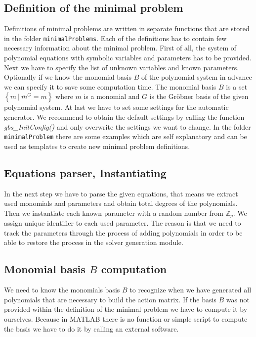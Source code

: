 \subsection{Definition of the minimal problem}
\label{subsec:MinimalProblemDefinition}
Definitions of minimal problems are written in separate functions that are stored in the folder \texttt{minimalProblems}. Each of the definitions has to contain few necessary information about the minimal problem. First of all, the system of polynomial equations with symbolic variables and parameters has to be provided. Next we have to specify the list of unknown variables and known parameters. Optionally if we know the monomial basis $B$ of the polynomial system in advance we can specify it to save some computation time. The monomial basis $B$ is a set $\left\{m\ |\ \overline{m}^G = m\right\}$ where $m$ is a monomial and $G$ is the Gr\"obner basis of the given polynomial system. At last we have to set some settings for the automatic generator. We recommend to obtain the default settings by calling the function \textit{gbs\_InitConfig()} and only overwrite the settings we want to change. In the folder \texttt{minimalProblem} there are some examples which are self explanatory and can be used as templates to create new minimal problem definitions.

\subsection{Equations parser, Instantiating}
In the next step we have to parse the given equations, that means we extract used monomials and parameters and obtain total degrees of the polynomials. Then we instantiate each known parameter with a random number from $\mathbb{Z}_p$. We assign unique identifier to each used parameter. The reason is that we need to track the parameters through the process of adding polynomials in order to be able to restore the process in the solver generation module.

\subsection{Monomial basis $B$ computation}
We need to know the monomials basis $B$ to recognize when we have generated all polynomials that are necessary to build the action matrix. If the basis $B$ was not provided within the definition of the minimal problem we have to compute it by ourselves. Because in MATLAB there is no function or simple script to compute the basis we have to do it by calling an external software.


